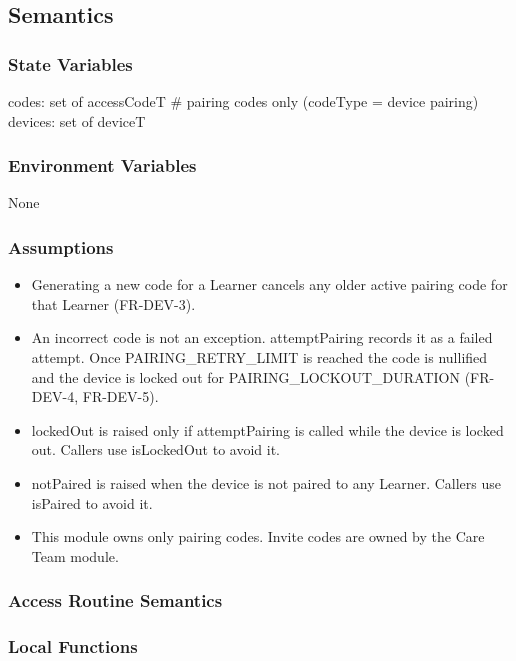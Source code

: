 \documentclass[12pt, titlepage]{article}
\begin{document}
\subsection{Semantics}

\subsubsection{State Variables}

codes: set of accessCodeT \# pairing codes only (codeType = device pairing) \\
devices: set of deviceT

\subsubsection{Environment Variables}

None

\subsubsection{Assumptions}

\begin{itemize}
\item Generating a new code for a Learner cancels any older active pairing code
  for that Learner (FR-DEV-3).
\item An incorrect code is not an exception. attemptPairing records it as a
  failed attempt. Once PAIRING\_RETRY\_LIMIT is reached the code is nullified
  and the device is locked out for PAIRING\_LOCKOUT\_DURATION (FR-DEV-4,
  FR-DEV-5).
\item lockedOut is raised only if attemptPairing is called while the device is
  locked out. Callers use isLockedOut to avoid it.
\item notPaired is raised when the device is not paired to any Learner. Callers
  use isPaired to avoid it.
\item This module owns only pairing codes. Invite codes are owned by the Care
  Team module.
\end{itemize}

\subsubsection{Access Routine Semantics}

\subsubsection{Local Functions}
\end{document}
